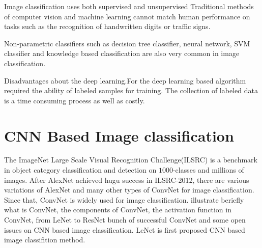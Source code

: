 \documentclass[10pt,twocolumn,letterpaper]{article}
\begin{document}
Image classification uses both supervised and unsupervised
Traditional  methods  of  computer  vision  and  machine
learning cannot match human performance on tasks such
as the recognition of handwritten digits or traffic signs.\cite{ciregancolumn}

Non‐parametric  classifiers  such  as  decision tree   classifier,  neural   network,   SVM   classifier and knowledge based classification are also very common in image classification.

Disadvantages about the deep learning.For the deep learning based algorithm required the ability of labeled samples for training. The collection of labeled data is a time consuming process as well as costly.



\section{CNN Based Image classification}

\par
The ImageNet Large Scale Visual Recognition Challenge(ILSRC) is a benchmark in object category classification and detection on $1000$-classes and millions of images. After AlexNet achieved hugu success in ILSRC-2012, there are various variations of AlexNet\cite{krizhevsky2012imagenet} and many other types of ConvNet for image classification. Since that, ConvNet is widely used for image classification. \cite{aloysius2017review} illustrate beriefly what is ConvNet, the components of ConvNet, the activation function in ConvNet, from LeNet to ResNet bunch of successful ConvNet and some open issues on CNN based image classification. LeNet is first proposed CNN based image classifition method.
\end{document}
